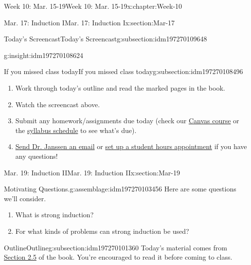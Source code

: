 \documentclass[oneside,10pt,]{book}
\numberwithin{equation}{section}
\begin{document}
\begin{chapterptx}{Week 10: Mar. 15-19}{}{Week 10: Mar. 15-19}{}{}{x:chapter:Week-10}
\begin{sectionptx}{Mar. 17: Induction I}{}{Mar. 17: Induction I}{}{}{x:section:Mar-17}
\begin{subsectionptx}{Today's Screencast}{}{Today's Screencast}{}{}{g:subsection:idm197270109648}
\begin{insight}{}{g:insight:idm197270108624}
\end{insight}
\end{subsectionptx}
%
%
\typeout{************************************************}
\typeout{************************************************}
%
\begin{subsectionptx}{If you missed class today}{}{If you missed class today}{}{}{g:subsection:idm197270108496}
%
\begin{enumerate}
\item{}Work through today's outline and read the marked pages in the book.%
\item{}Watch the screencast above.%
\item{}Submit any homework\slash{}assignments due today (check our \href{https://dordt.instructure.com/courses/3110050}{Canvas course} or the \href{https://prof.mkjanssen.org/ds/index.html\#schedule}{syllabus schedule} to see what's due).%
\item{}\href{mailto:mike.janssen@dordt.edu}{Send Dr. Janssen an email} or \href{https://calendly.com/mkjanssen/student-hours}{set up a student hours appointment} if you have any questions!%
\end{enumerate}
\end{subsectionptx}
\end{sectionptx}
%
%
\typeout{************************************************}
\typeout{************************************************}
%
\begin{sectionptx}{Mar. 19: Induction II}{}{Mar. 19: Induction II}{}{}{x:section:Mar-19}
\begin{introduction}{}%
\begin{assemblage}{Motivating Questions.}{g:assemblage:idm197270103456}%
Here are some questions we'll consider. %
\begin{enumerate}
\item{}What is strong induction?%
\item{}For what kinds of problems can strong induction be used?%
\end{enumerate}
%
\end{assemblage}
\end{introduction}%
%
%
\typeout{************************************************}
\typeout{************************************************}
%
\begin{subsectionptx}{Outline}{}{Outline}{}{}{g:subsection:idm197270101360}
Today's material comes from \href{http://discrete.openmathbooks.org/dmoi3/sec_seq-induction.html}{Section 2.5} of the book. You're encouraged to read it before coming to class.%

\end{subsectionptx}
\end{sectionptx}
\end{chapterptx}
\end{document}
